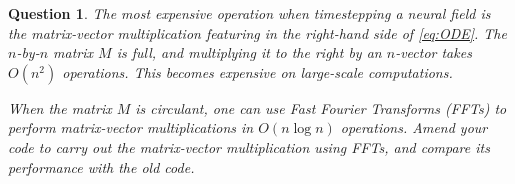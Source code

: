 \documentclass[a4paper]{siamonline220329}
\theoremstyle{plain}
\newtheorem{question}{Question}
\begin{document}
\begin{question}
  The most expensive operation when timestepping a neural field is the matrix-vector
  multiplication featuring in the right-hand side of \cref{eq:ODE}. The $n$-by-$n$
  matrix $M$ is full, and multiplying it to the right by an $n$-vector takes $O(n^2)$
  operations. This becomes expensive on large-scale computations.

  When the matrix $M$ is circulant, one can use Fast Fourier Transforms (FFTs) to perform
  matrix-vector multiplications in $O(n \log n)$ operations. Amend your code to carry
  out the matrix-vector multiplication using FFTs, and compare its performance with
  the old code.
\end{question}


% 
% 
\end{document}
